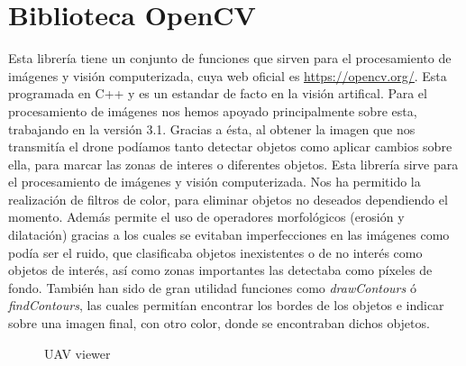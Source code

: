 \section{Biblioteca OpenCV}
\label{sec:BibliotecaOpenCV} 
\hspace{1 cm} Esta librer\'ia tiene un conjunto de funciones que sirven para el procesamiento de im\'agenes y visi\'on computerizada, cuya web oficial es \underline{\url{https://opencv.org/}}. Esta programada en C++ y es un estandar de facto en la visi\'on artifical. Para el procesamiento de im\'agenes nos hemos apoyado principalmente sobre esta, trabajando en la versi\'on 3.1. Gracias a \'esta, al obtener la imagen que nos transmit\'ia el drone pod\'iamos tanto detectar objetos como aplicar cambios sobre ella, para marcar las zonas de interes o diferentes objetos. Esta librer\'ia sirve para el procesamiento de im\'agenes y visi\'on computerizada. Nos ha permitido la realizaci\'on de filtros de color, para eliminar objetos no deseados dependiendo el momento. Adem\'as permite el uso de operadores morfol\'ogicos (erosi\'on y dilataci\'on) gracias a los cuales se evitaban imperfecciones en las im\'agenes como pod\'ia ser el ruido, que clasificaba objetos inexistentes o de no inter\'es como objetos de inter\'es, as\'i como zonas importantes las detectaba como p\'ixeles de fondo. Tambi\'en han sido de gran utilidad funciones como \textit{drawContours} \'o \textit{findContours}, las cuales permit\'ian encontrar los bordes de los objetos e indicar sobre una imagen final, con otro color, donde se encontraban dichos objetos. 



\begin{figure}[H]
 \centering
 \caption{UAV viewer}
 \label{f:OpenCV}
\end{figure} 









